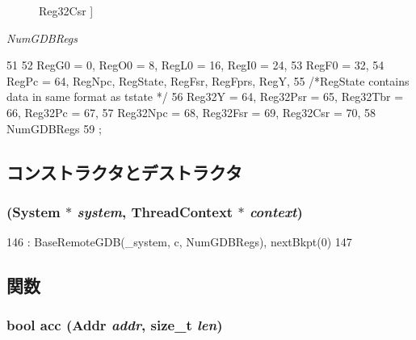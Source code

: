 \begin{Desc}
\begin{description}
{\hypertarget{classSparcISA_1_1RemoteGDB_a0748febeccc78e9758d731bace037b44a1f792cf93e66b480ade38aced6940bf2}{
Reg32Csr}
\label{classSparcISA_1_1RemoteGDB_a0748febeccc78e9758d731bace037b44a1f792cf93e66b480ade38aced6940bf2}
}]\item[{\em 
\hypertarget{classSparcISA_1_1RemoteGDB_a0748febeccc78e9758d731bace037b44a811ff1e724004c1673663ccdea46e573}{
NumGDBRegs}
\label{classSparcISA_1_1RemoteGDB_a0748febeccc78e9758d731bace037b44a811ff1e724004c1673663ccdea46e573}
}]\end{description}
\end{Desc}




\begin{DoxyCode}
51     {
52         RegG0 = 0, RegO0 = 8, RegL0 = 16, RegI0 = 24,
53         RegF0 = 32,
54         RegPc = 64, RegNpc, RegState, RegFsr, RegFprs, RegY,
55         /*RegState contains data in same format as tstate */
56         Reg32Y = 64, Reg32Psr = 65, Reg32Tbr = 66, Reg32Pc = 67,
57         Reg32Npc = 68, Reg32Fsr = 69, Reg32Csr = 70,
58         NumGDBRegs
59     };
\end{DoxyCode}


\subsection{コンストラクタとデストラクタ}
\hypertarget{classSparcISA_1_1RemoteGDB_a7d97c5a4edd8630299b2b0521ae32d98}{
\subsubsection[{RemoteGDB}]{ ({\bf System} $\ast$ {\em system}, \/  {\bf ThreadContext} $\ast$ {\em context})}}
\label{classSparcISA_1_1RemoteGDB_a7d97c5a4edd8630299b2b0521ae32d98}



\begin{DoxyCode}
146     : BaseRemoteGDB(_system, c, NumGDBRegs), nextBkpt(0)
147 {}
\end{DoxyCode}


\subsection{関数}
\hypertarget{classSparcISA_1_1RemoteGDB_ac4c7be164f087f2f53d137d9768809a7}{
\subsubsection[{acc}]{\setlength{\rightskip}{0pt plus 5cm}bool acc ({\bf Addr} {\em addr}, \/  size\_\-t {\em len})}}
\label{classSparcISA_1_1RemoteGDB_ac4c7be164f087f2f53d137d9768809a7}


